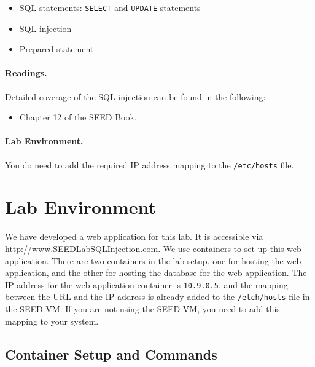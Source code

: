 \begin{itemize}[noitemsep]
\item SQL statements: \texttt{SELECT} and \texttt{UPDATE} statements
\item SQL injection
\item Prepared statement
\end{itemize}



\paragraph{Readings.}
Detailed coverage of the SQL injection can be found in the following:

\begin{itemize}
\item Chapter 12 of the SEED Book, \seedbook
\end{itemize}

\paragraph{Lab Environment.} \seedenvironmentB \nodependency
You do need to add the required IP address mapping to
the \texttt{/etc/hosts} file.  


\section{Lab Environment}


We have developed a web application for this lab. It is 
accessible via \url{http://www.SEEDLabSQLInjection.com}. 
We use containers to set up this web application. There 
are two containers in the lab setup, one for hosting 
the web application, and the other for hosting the database 
for the web application. 
The IP address for the web application container is \texttt{10.9.0.5}, and 
the mapping between the URL and the IP address is 
already added to the \texttt{/etch/hosts} file in the 
SEED VM. If you are not using the SEED VM, you
need to add this mapping to your system. 


\subsection{Container Setup and Commands}

